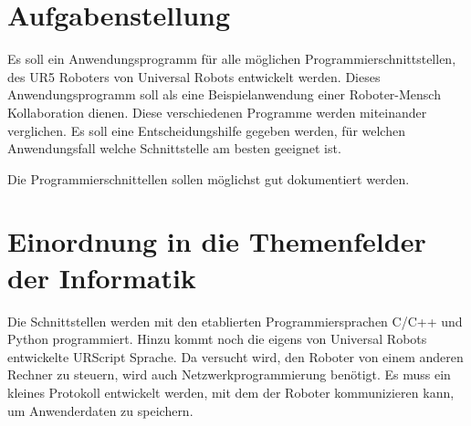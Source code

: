 \section{Aufgabenstellung}
\label{aufgabenstellung}

Es soll ein Anwendungsprogramm für alle möglichen Programmierschnittstellen, des UR5 Roboters von Universal Robots entwickelt werden.
Dieses Anwendungsprogramm soll als eine Beispielanwendung einer Roboter-Mensch Kollaboration dienen.
Diese verschiedenen Programme werden miteinander verglichen. Es soll eine Entscheidungshilfe gegeben werden, für welchen Anwendungsfall welche Schnittstelle am besten geeignet ist.

Die Programmierschnittellen sollen möglichst gut dokumentiert werden.  

\section{Einordnung in die Themenfelder der Informatik}
\label{sec:einordnung}

Die Schnittstellen werden mit den etablierten Programmiersprachen C/C++ und Python programmiert. Hinzu kommt noch die eigens von Universal Robots entwickelte URScript Sprache.
Da versucht wird, den Roboter von einem anderen Rechner zu steuern, wird auch Netzwerkprogrammierung benötigt. Es muss ein kleines Protokoll entwickelt werden, mit dem der Roboter kommunizieren kann, um Anwenderdaten zu speichern. 
